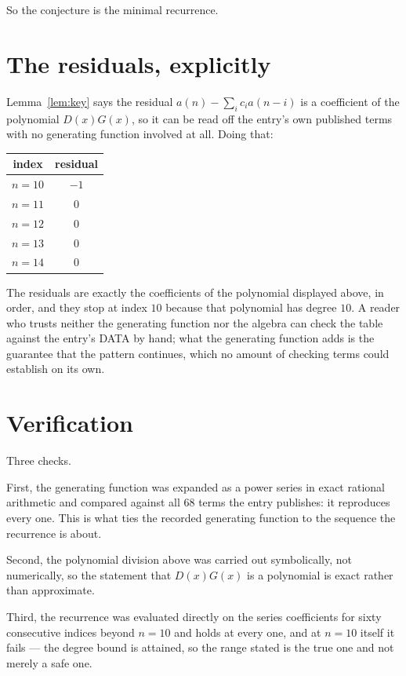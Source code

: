\documentclass[11pt,a4paper]{article}
\theoremstyle{plain}
\theoremstyle{definition}
\begin{document}
So the conjecture is the minimal recurrence.

\section{The residuals, explicitly}

Lemma~\ref{lem:key} says the residual $a(n)-\sum_ic_ia(n-i)$ is a coefficient of the
polynomial $D(x)G(x)$, so it can be read off the entry's own published terms with no
generating function involved at all. Doing that:
\begin{center}
\begin{tabular}{cc}
index & residual \\ \hline
$n=10$ & $-1$ \\
$n=11$ & $0$ \\
$n=12$ & $0$ \\
$n=13$ & $0$ \\
$n=14$ & $0$
\end{tabular}
\end{center}
The residuals are exactly the coefficients of the polynomial displayed above, in order, and
they stop at index $10$ because that polynomial has degree $10$. A reader who trusts
neither the generating function nor the algebra can check the table against the entry's DATA
by hand; what the generating function adds is the guarantee that the pattern continues, which
no amount of checking terms could establish on its own.

\section{Verification}

Three checks.

First, the generating function was expanded as a power series in exact rational arithmetic and
compared against all $68$ terms the entry publishes: it reproduces every one. This is
what ties the recorded generating function to the sequence the recurrence is about.

Second, the polynomial division above was carried out symbolically, not numerically, so the
statement that $D(x)G(x)$ is a polynomial is exact rather than approximate.

Third, the recurrence was evaluated directly on the series coefficients for sixty consecutive
indices beyond $n=10$ and holds at every one, and at $n=10$ itself it fails --- the
degree bound is attained, so the range stated is the true one and not merely a safe one.
\end{document}
